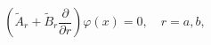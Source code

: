 \begin{equation}
\left( \tilde{A}_{r}+\tilde{B}_{r}\frac{\partial }{\partial r}\right)
\varphi (x)=0,\quad r=a,b,  \label{mrobcond}
\end{equation}

